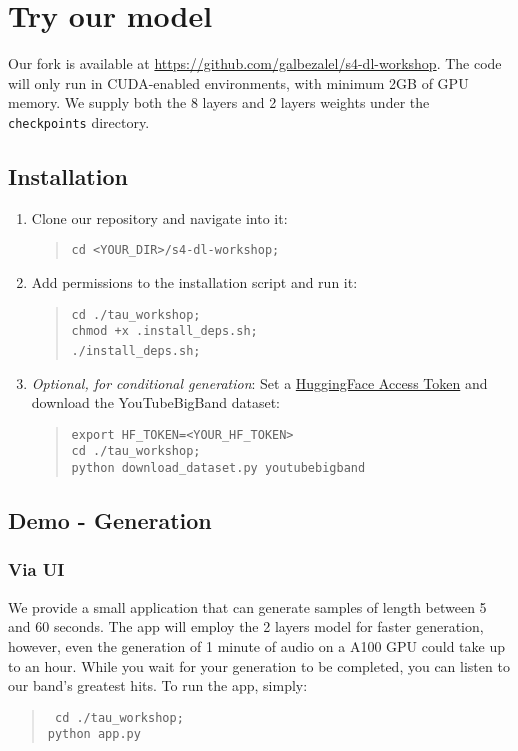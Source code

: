 \documentclass[12pt]{article}
\begin{document}
\section{Try our model}
Our fork is available at \href{https://github.com/galbezalel/s4-dl-workshop}{https://github.com/galbezalel/s4-dl-workshop}. The code will only run in CUDA-enabled environments, with minimum 2GB of GPU memory. We supply both the 8 layers and 2 layers weights under the \texttt{checkpoints} directory.
\subsection{Installation}
\begin{enumerate}
    \item Clone our repository and navigate into it: 
    \begin{quote}
        \texttt{cd <YOUR\_DIR>/s4-dl-workshop;}
    \end{quote}
    \item Add permissions to the installation script and run it: 
    \begin{quote}
        \texttt{cd ./tau\_workshop;}\\
        \texttt{chmod +x .install\_deps.sh;}\\
        \texttt{./install\_deps.sh;}\
    \end{quote}
    \item \textit{Optional, for conditional generation}: Set a \href{https://huggingface.co/docs/hub/en/security-tokens}{HuggingFace Access Token} and download the YouTubeBigBand dataset:
    \begin{quote}
        \texttt{export HF\_TOKEN=<YOUR\_HF\_TOKEN>}\\
        \texttt{cd ./tau\_workshop;}\\
        \texttt{python download\_dataset.py youtubebigband}\\
    \end{quote}
\end{enumerate}
\subsection{Demo - Generation}
\subsubsection{Via UI}
We provide a small application that can generate samples of length between 5 and 60 seconds. The app will employ the 2 layers model for faster generation, however, even the generation of 1 minute of audio on a A100 GPU could take up to an hour. While you wait for your generation to be completed, you can listen to our band's greatest hits.
To run the app, simply:
\begin{quote}
    \texttt{
        \texttt{cd ./tau\_workshop;}\\
        \texttt{python app.py}\\
    }
\end{quote}
\end{document}
